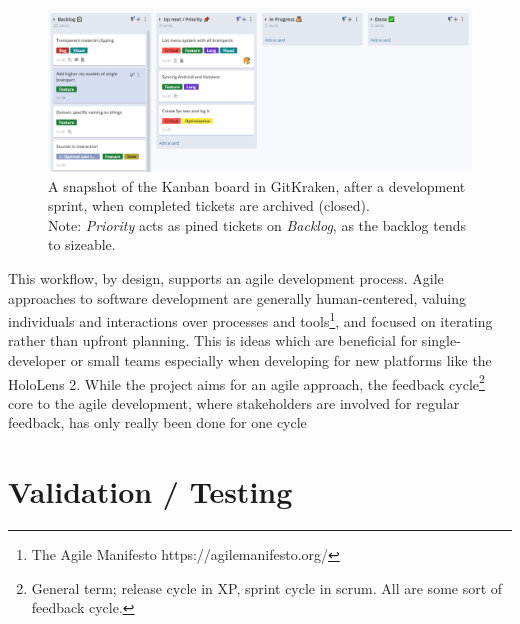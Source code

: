 \begin{figure}[h]
    \includegraphics[width=\textwidth]{fig/kanban2}
        \caption{A snapshot of the Kanban board in GitKraken, after a development sprint, when completed tickets are archived (closed).\\ Note: \textit{Priority} acts as pined tickets on \textit{Backlog}, as the backlog tends to sizeable.}
\end{figure}

This workflow, by design, supports an agile development process. Agile approaches to software development are generally human-centered, valuing individuals and interactions over processes and tools\footnote{The Agile Manifesto https://agilemanifesto.org/}, and focused on iterating rather than upfront planning. This is ideas which are beneficial for single-developer or small teams especially when developing for new platforms like the HoloLens 2. 
While the project aims for an agile approach, the feedback cycle\footnote{General term; release cycle in XP, sprint cycle in scrum. All are some sort of feedback cycle.} core to the agile development, where stakeholders are involved for regular feedback, has only really been done for one cycle 








\section{Validation / Testing}


